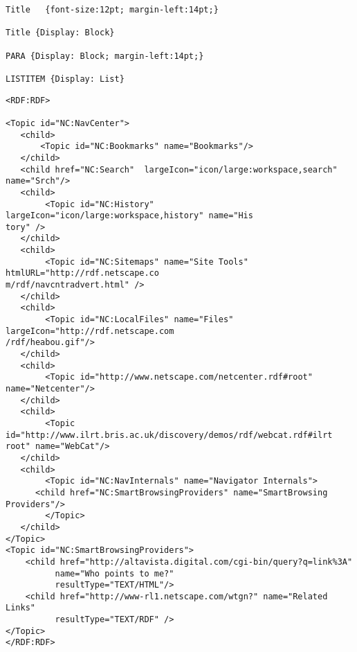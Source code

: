 {\newpage\clearpage
{}%
\begin{breakbox}\begin{tex2html_preform}\begin{verbatim}Title   {font-size:12pt; margin-left:14pt;}

Title {Display: Block}

PARA {Display: Block; margin-left:14pt;}

LISTITEM {Display: List}\end{verbatim}\end{tex2html_preform}
\end{breakbox}%
\lthtmlfigureZ
\hfill\lthtmlcheckvsize\clearpage}

{\newpage\clearpage
{}%
\begin{breakbox}\begin{tex2html_preform}\begin{verbatim}<RDF:RDF>

<Topic id="NC:NavCenter">  
   <child>
       <Topic id="NC:Bookmarks" name="Bookmarks"/>
   </child>
   <child href="NC:Search"  largeIcon="icon/large:workspace,search" name="Srch"/>
   <child>
        <Topic id="NC:History" largeIcon="icon/large:workspace,history" name="His
tory" />
   </child>
   <child>
        <Topic id="NC:Sitemaps" name="Site Tools" htmlURL="http://rdf.netscape.co
m/rdf/navcntradvert.html" />
   </child>
   <child>
        <Topic id="NC:LocalFiles" name="Files" largeIcon="http://rdf.netscape.com
/rdf/heabou.gif"/>
   </child>
   <child>
        <Topic id="http://www.netscape.com/netcenter.rdf#root" name="Netcenter"/>
   </child> 
   <child>
        <Topic id="http://www.ilrt.bris.ac.uk/discovery/demos/rdf/webcat.rdf#ilrt
root" name="WebCat"/>
   </child>
   <child>
        <Topic id="NC:NavInternals" name="Navigator Internals">
	  <child href="NC:SmartBrowsingProviders" name="SmartBrowsing Providers"/>
        </Topic>
   </child>
</Topic>
<Topic id="NC:SmartBrowsingProviders">
    <child href="http://altavista.digital.com/cgi-bin/query?q=link%3A"
          name="Who points to me?"
          resultType="TEXT/HTML"/>
    <child href="http://www-rl1.netscape.com/wtgn?" name="Related Links"
          resultType="TEXT/RDF" />
</Topic>
</RDF:RDF>\end{verbatim}\end{tex2html_preform}
\end{breakbox}%
\lthtmlfigureZ
\hfill\lthtmlcheckvsize\clearpage}




